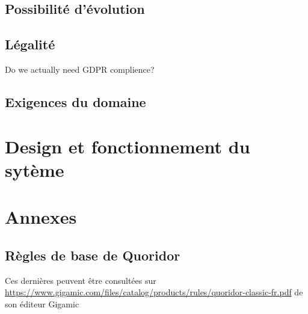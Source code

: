 \documentclass[french, utf8]{article}
\begin{document}
\subsection{Possibilité d'évolution}


\subsection{Légalité}

Do we actually need GDPR complience?

\subsection{Exigences du domaine}


\section{Design et fonctionnement du sytème}


\section{Annexes}
\subsection{Règles de base de Quoridor}
Ces dernières peuvent être consultées sur \href{https://www.gigamic.com/files/catalog/products/rules/quoridor-classic-fr.pdf}{https://www.gigamic.com/files/catalog/products/rules/quoridor-classic-fr.pdf} de son éditeur Gigamic
\end{document}
